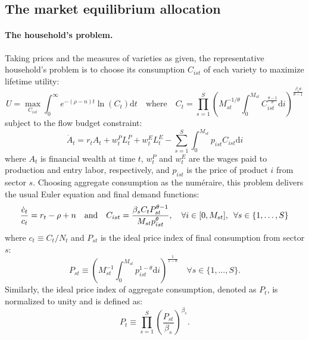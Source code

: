 \documentclass[12pt]{article}
\newcommand{\smallquad}{\hspace{0.5em}}
\begin{document}
\clearpage

\subsection{The market equilibrium allocation}
\label{a:market equilibrium allocation}

\paragraph{The household's problem.} Taking prices and the measures of varieties as given, the representative household's problem is to choose its consumption $C_{ist}$ of each variety to maximize lifetime utility:
\begin{equation*}
    U = \max_{C_{ist}} \int_0^{\infty} e^{-(\rho - n) t} \ln(C_t) \text{d}t \quad \text{where} \quad C_t = \prod_{s = 1}^S \left(M_{st}^{-1 / \theta} \int_0^{M_{st}} C_{ist}^{\frac{\theta - 1}{\theta}} \text{d}i\right)^{\frac{\beta_s \theta}{\theta - 1}}
\end{equation*}
subject to the flow budget constraint:
\begin{equation*}
    \dot{A}_t = r_t A_t + w_t^P L_t^P + w_t^E L_t^E - \sum_{s = 1}^S \int_0^{M_{st}} p_{ist} C_{ist} \text{d}i
\end{equation*}
where $A_t$ is financial wealth at time $t$, $w_t^P$ and $w_t^E$ are the wages paid to production and entry labor, respectively, and $p_{ist}$ is the price of product $i$ from sector $s$. Choosing aggregate consumption as the num\'eraire, this problem delivers the usual Euler equation and final demand functions:
\begin{equation*}
    \frac{\dot{c}_t}{c_t} = r_t - \rho + n \quad \text{and} \quad C_{ist} = \frac{\beta_s C_t P_{st}^{\theta - 1}}{M_{st} p_{ist}^{\theta}}, \quad \forall i \in [0, M_{st}], \smallquad \forall s \in \{1, \ldots, S\}
\end{equation*}
where $c_t \equiv C_t / N_t$ and $P_{st}$ is the ideal price index of final consumption from sector $s$:
\begin{equation*}
    P_{st} \equiv \left(M_{st}^{-1} \int_0^{M_{st}} p_{ist}^{1 - \theta} \text{d}i\right)^{\frac{1}{1 - \theta}} \quad \forall s \in \{1, \ldots, S\}.
\end{equation*}
Similarly, the ideal price index of aggregate consumption, denoted as $P_t$, is normalized to unity and is defined as:
\begin{equation*}
    P_t \equiv \prod_{s = 1}^S \left(\frac{P_{st}}{\beta_s}\right)^{\beta_s}.
\end{equation*}
\end{document}
